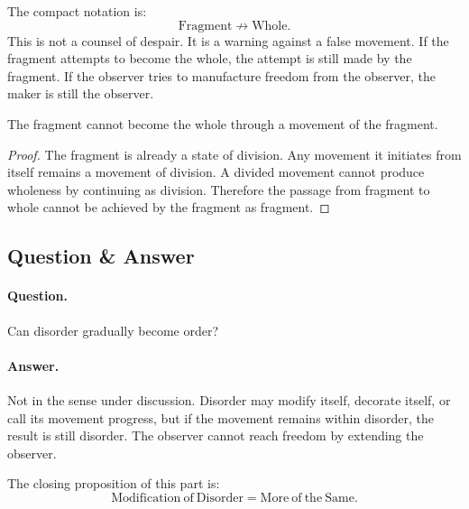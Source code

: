 The compact notation is:
\begin{equation}
\mathrm{Fragment}\nrightarrow\mathrm{Whole}.
\end{equation}
This is not a counsel of despair. It is a warning against a false movement. If the fragment attempts to become the whole, the attempt is still made by the fragment. If the observer tries to manufacture freedom from the observer, the maker is still the observer.

\begin{proposition}
The fragment cannot become the whole through a movement of the fragment.
\end{proposition}

\begin{proof}
The fragment is already a state of division. Any movement it initiates from itself remains a movement of division. A divided movement cannot produce wholeness by continuing as division. Therefore the passage from fragment to whole cannot be achieved by the fragment as fragment.
\end{proof}

\subsection{Question \& Answer}

\paragraph{Question.}
Can disorder gradually become order?

\paragraph{Answer.}
Not in the sense under discussion. Disorder may modify itself, decorate itself, or call its movement progress, but if the movement remains within disorder, the result is still disorder. The observer cannot reach freedom by extending the observer.

The closing proposition of this part is:
\begin{equation}
\mathrm{Modification\ of\ Disorder}
=
\mathrm{More\ of\ the\ Same}.
\end{equation}

